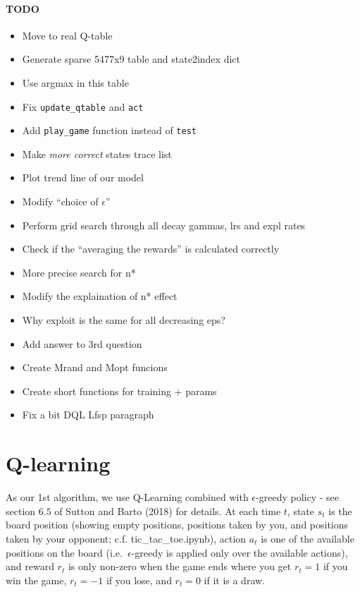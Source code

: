 \documentclass[11pt]{article}
\providecommand{\tightlist}{%
      \setlength{\itemsep}{0pt}\setlength{\parskip}{0pt}}
\begin{document}
    \hypertarget{todo}{%
\paragraph{TODO}\label{todo}}

\begin{itemize}
\tightlist
\item
  Move to real Q-table
\item
  Generate sparse 5477x9 table and state2index dict
\item
  Use argmax in this table
\item
  Fix \texttt{update\_qtable} and \texttt{act}
\item
  Add \texttt{play\_game} function instead of \texttt{test}
\item
  Make \emph{more correct} states trace list
\item
  Plot trend line of our model
\item
  Modify ``choice of \(\epsilon\)''
\item
  Perform grid search through all decay gammas, lrs and expl rates
\item
  Check if the ``averaging the rewards'' is calculated correctly
\item
  More precise search for n*
\item
  Modify the explaination of n* effect
\item
  Why exploit is the same for all decreasing eps?
\item
  Add answer to 3rd question
\item
  Create Mrand and Mopt funcions
\item
  Create short functions for training + params
\item
  Fix a bit DQL Lfsp paragraph
\end{itemize}

    \hypertarget{q-learning}{%
\section{Q-learning}\label{q-learning}}

    As our 1st algorithm, we use Q-Learning combined with
\(\epsilon\)-greedy policy - see section \(6.5\) of Sutton and Barto
(2018) for details. At each time \(t\), state \(s_{t}\) is the board
position (showing empty positions, positions taken by you, and positions
taken by your opponent; c.f. tic\_tac\_toe.ipynb), action \(a_{t}\) is
one of the available positions on the board (i.e.~\(\epsilon\)-greedy is
applied only over the available actions), and reward \(r_{t}\) is only
non-zero when the game ends where you get \(r_{t}=1\) if you win the
game, \(r_{t}=-1\) if you lose, and \(r_{t}=0\) if it is a draw.
\end{document}

